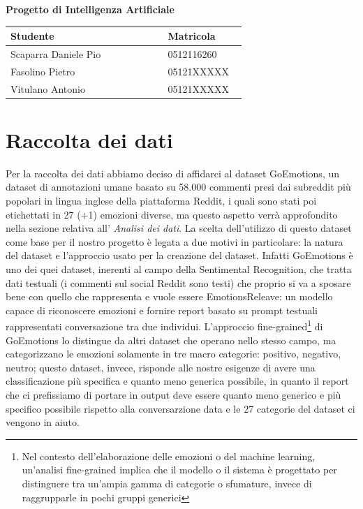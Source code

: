 \documentclass{article}
\begin{document}
\begin{center}
\fontsize{14}{18pt} \selectfont \textbf{Progetto di Intelligenza Artificiale}

\vspace{1cm}

\begin{tabular}{|p{0.6\linewidth}|p{0.3\linewidth}|}
\hline
    \textbf{Studente} & \textbf{Matricola} \\
\hline
    Scaparra Daniele Pio & 0512116260 \\
\hline
    Fasolino Pietro & 05121XXXXX \\
\hline
    Vitulano Antonio & 05121XXXXX \\
\hline
\end{tabular}

\end{center}

\maketitle
    
    \section{Raccolta dei dati}\label{sec:raccolta-dei-dati}
Per la raccolta dei dati abbiamo deciso di affidarci al dataset GoEmotions, un dataset di annotazioni umane basato su 58.000 commenti presi dai subreddit più popolari in lingua inglese della piattaforma Reddit, i quali sono stati poi etichettati in 27 (+1) emozioni diverse, ma questo aspetto verrà approfondito nella sezione relativa all' \textit{Analisi dei dati}.
La scelta dell'utilizzo di questo dataset come base per il nostro progetto è legata a due motivi in particolare: la natura del dataset e l'approccio usato per la creazione del dataset.
Infatti GoEmotions è uno dei quei dataset, inerenti al campo della Sentimental Recognition, che tratta dati testuali (i commenti sul social Reddit sono testi) che proprio si va a sposare bene con quello che rappresenta e vuole essere EmotionsReleave: un modello capace di riconoscere emozioni e fornire report basato su prompt testuali rappresentati conversazione tra due individui.
L'approccio fine-grained\footnote{
Nel contesto dell'elaborazione delle emozioni o del machine learning, un'analisi fine-grained implica che il modello o il sistema è progettato per distinguere tra un'ampia gamma di categorie o sfumature, invece di raggrupparle in pochi gruppi generici
} di GoEmotions lo distingue da altri dataset che operano nello stesso campo, ma categorizzano le emozioni solamente in tre macro categorie: positivo, negativo, neutro; questo dataset, invece, risponde alle nostre esigenze di avere una classificazione più specifica e quanto meno generica possibile, in quanto il report che ci prefissiamo di portare in output deve essere quanto meno generico e più specifico possibile rispetto alla conversarzione data e le 27 categorie del dataset ci vengono in aiuto.
\end{document}
